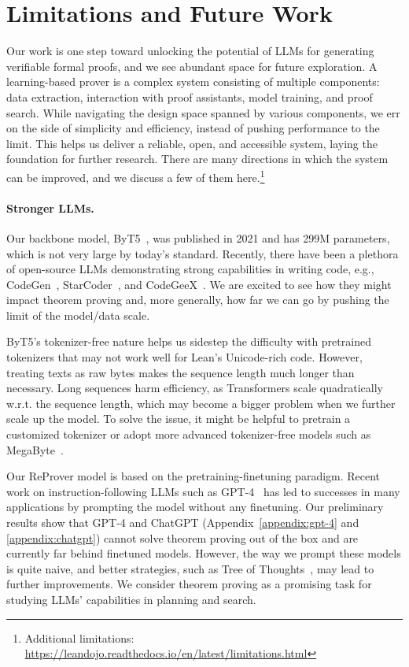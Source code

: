 \documentclass{article}
\newcommand{\smallsec}[1]{\vspace{-1mm} \paragraph{#1.}}
\newcommand\name{ReProver}
\begin{document}
\section{Limitations and Future Work}
\label{appendix:limitations}


Our work is one step toward unlocking the potential of LLMs for generating verifiable formal proofs, and we see abundant space for future exploration. A learning-based prover is a complex system consisting of multiple components: data extraction, interaction with proof assistants, model training, and proof search. While navigating the design space spanned by various components, we err on the side of simplicity and efficiency, instead of pushing performance to the limit. This helps us deliver a reliable, open, and accessible system, laying the foundation for further research. There are many directions in which the system can be improved, and we discuss a few of them here.\footnote{Additional limitations: \url{https://leandojo.readthedocs.io/en/latest/limitations.html}}


\smallsec{Stronger LLMs}
Our backbone model, ByT5~\cite{xue2022byt5}, was published in 2021 and has 299M parameters, which is not very large by today's standard. Recently, there have been a plethora of open-source LLMs demonstrating strong capabilities in writing code, e.g., CodeGen~\cite{nijkamp2022codegen},  StarCoder~\cite{li2023starcoder}, and CodeGeeX~\cite{zheng2023codegeex}. We are excited to see how they might impact theorem proving and, more generally, how far we can go by pushing the limit of the model/data scale. 

ByT5's tokenizer-free nature helps us sidestep the difficulty with pretrained tokenizers that may not work well for Lean's Unicode-rich code. However, treating texts as raw bytes makes the sequence length much longer than necessary. Long sequences harm efficiency, as Transformers scale quadratically w.r.t. the sequence length, which may become a bigger problem when we further scale up the model. To solve the issue, it might be helpful to pretrain a customized tokenizer or adopt more advanced tokenizer-free models such as MegaByte~\cite{yu2023megabyte}.


Our {\name} model is based on the pretraining-finetuning paradigm. Recent work on instruction-following LLMs such as GPT-4~\cite{openai2023gpt4} has led to successes in many applications by prompting the model without any finetuning. Our preliminary results show that GPT-4 and ChatGPT (Appendix~\ref{appendix:gpt-4} and \ref{appendix:chatgpt}) cannot solve theorem proving out of the box and are currently far behind finetuned models. However, the way we prompt these models is quite naive, and better strategies, such as Tree of Thoughts~\cite{yao2023tree}, may lead to further improvements. We consider theorem proving as a promising task for studying LLMs' capabilities in planning and search.
\end{document}
